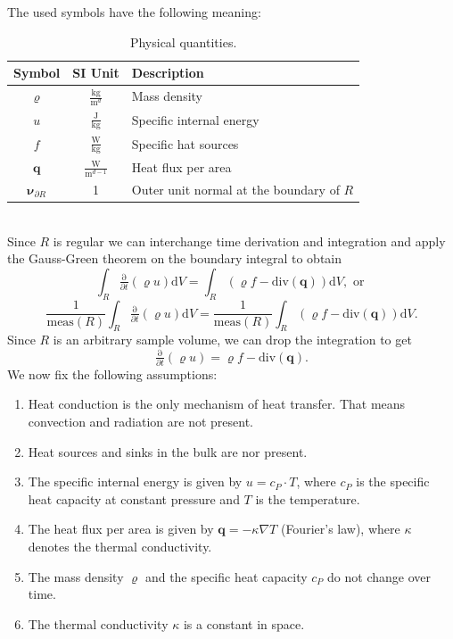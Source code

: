 \documentclass[a4paper,11pt]{article}
\theoremstyle{plain} %
\theoremstyle{definition} %
\theoremstyle{remark} %
\theoremstyle{remark}
\def\Temp{T}
\begin{document}
The used symbols have the following meaning:
\begin{table}[h!] 
\centering
{\renewcommand{\arraystretch}{1.4}
\begin{tabular}{ccl}
\toprule
\textbf{Symbol} & \textbf{SI Unit} & \textbf{Description}\\
\midrule
$\varrho$ & $\tfrac{\mathrm{kg}}{\mathrm{m}^d}$ & Mass density \\
$u $ & $\tfrac{\mathrm{J}}{\mathrm{kg}}$ & Specific internal energy \\
$f$ & $\tfrac{\mathrm{W}}{\mathrm{kg}}$ & Specific hat sources \\
$\boldsymbol{q}$ & $\tfrac{\mathrm{W}}{\mathrm{m}^{d-1}}$ & Heat flux per area\\
$\boldsymbol{\nu}_{\partial R}$ & 1 & Outer unit normal at the boundary of $R$\\
\bottomrule
\end{tabular}}
\caption{Physical quantities.}
\label{TablePhysicalQuantities}
\end{table}
\\
Since $R$ is regular we can interchange time derivation and integration and apply the Gauss-Green theorem on the boundary integral to obtain
\begin{equation*}
\int_R \tfrac{\mathrm{\partial}}{\partial t}  \left( \varrho u \right) \mathrm{d} V = \int_R \left( \varrho f  -  \mathrm{div}(\boldsymbol{q}) \right) \mathrm{d} V , \text{ or }
\end{equation*}
\begin{equation*}
\frac{1}{\mathrm{meas}(R)}\int_R \tfrac{\mathrm{\partial}}{\partial t}  \left( \varrho u \right) \mathrm{d} V = \frac{1}{\mathrm{meas}(R)} \int_R \left( \varrho f  -  \mathrm{div}(\boldsymbol{q}) \right) \mathrm{d} V.
\end{equation*}
Since $R$ is an arbitrary sample volume, we can drop the integration to get
\begin{equation*}
\tfrac{\mathrm{\partial}}{\partial t}  \left( \varrho u \right) = \varrho f  -  \mathrm{div}(\boldsymbol{q}) .
\end{equation*}
We now fix the following assumptions:
\begin{enumerate}
\item[(A1)] Heat conduction is the only mechanism of heat transfer. That means convection and radiation are not present.
\item[(A2)] Heat sources and sinks in the bulk are nor present.
\item[(A3)] The specific internal energy is given by $u = c_P \cdot\Temp$, where $c_P$ is the specific heat capacity at constant pressure and $T$ is the temperature.
\item[(A4)] The heat flux per area is given by $ \boldsymbol{q} = - \kappa \nabla T $ (Fourier's law), where $\kappa $ denotes the thermal conductivity.
\item[(A5)] The mass density $\varrho $ and the specific heat capacity $c_P$ do not change over time.
\item[(A6)] The thermal conductivity $\kappa $ is a constant in space.
\end{enumerate}
\end{document}
